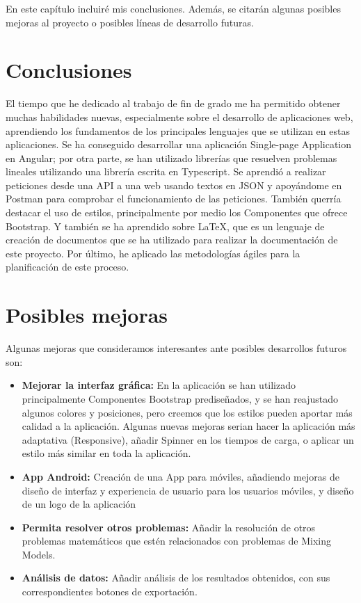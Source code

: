 
En este capítulo incluiré mis conclusiones. Además, se citarán algunas posibles mejoras al proyecto o posibles líneas de desarrollo futuras.

\section{Conclusiones}

El tiempo que he dedicado al trabajo de fin de grado me ha permitido obtener muchas habilidades nuevas, especialmente sobre el desarrollo de aplicaciones web, aprendiendo los fundamentos de los principales lenguajes que se utilizan en estas aplicaciones. Se ha conseguido desarrollar una aplicación Single-page Application en Angular; por otra parte, se han utilizado librerías que resuelven problemas lineales utilizando una librería escrita en Typescript. Se aprendió a realizar peticiones desde una API a una web usando textos en JSON y apoyándome en Postman para comprobar el funcionamiento de las peticiones. También querría destacar el uso de estilos, principalmente por medio los Componentes que ofrece Bootstrap. Y también se ha aprendido sobre \LaTeX{}, que es un lenguaje de creación de documentos que se ha utilizado para realizar la documentación de este proyecto. Por último, he aplicado las metodologías ágiles para la planificación de este proceso.

\section{Posibles mejoras}
Algunas mejoras que consideramos interesantes ante posibles desarrollos futuros son:

\begin{itemize}
    \item \textbf{Mejorar la interfaz gráfica:} En la aplicación se han utilizado principalmente Componentes Bootstrap prediseñados, y se han reajustado algunos colores y posiciones, pero creemos que los estilos pueden aportar más calidad a la aplicación. Algunas nuevas mejoras serian hacer la aplicación más adaptativa (Responsive), añadir Spinner en los tiempos de carga, o aplicar un estilo más similar en toda la aplicación. 
    \item \textbf{App Android:} Creación de una App para móviles, añadiendo mejoras de diseño de interfaz y experiencia de usuario para los usuarios móviles, y diseño de un logo de la aplicación
    \item \textbf{Permita resolver otros problemas:} Añadir la resolución de otros problemas matemáticos que estén relacionados con problemas de Mixing Models.
    \item \textbf{Análisis de datos:} Añadir análisis de los resultados obtenidos, con sus correspondientes botones de exportación.
\end{itemize}
